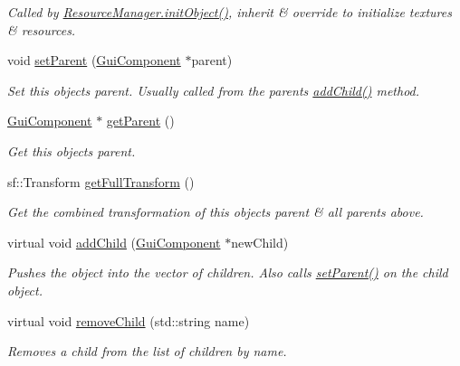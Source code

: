 \begin{DoxyCompactItemize}
\begin{DoxyCompactList}\small\item\em Called by \mbox{\hyperlink{class_resource_manager_ad543c034d0cef8fd2f3e8f32b49ebb3f}{Resource\+Manager.\+init\+Object()}}, inherit \& override to initialize textures \& resources. \end{DoxyCompactList}\item 
void \mbox{\hyperlink{class_gui_component_a526481fb2424c1ea771e78be27a091f9}{set\+Parent}} (\mbox{\hyperlink{class_gui_component}{Gui\+Component}} $\ast$parent)
\begin{DoxyCompactList}\small\item\em Set this object\textquotesingle{}s parent. Usually called from the parent\textquotesingle{}s \mbox{\hyperlink{class_gui_component_a5bccaccef3d0eab8af3be84cab1300de}{add\+Child()}} method. \end{DoxyCompactList}\item 
\mbox{\hyperlink{class_gui_component}{Gui\+Component}} $\ast$ \mbox{\hyperlink{class_gui_component_aba1969f731ef56396a1e69e50ff1f8fb}{get\+Parent}} ()
\begin{DoxyCompactList}\small\item\em Get this object\textquotesingle{}s parent. \end{DoxyCompactList}\item 
sf\+::\+Transform \mbox{\hyperlink{class_gui_component_a9402e70432502a9b8187365a95839a05}{get\+Full\+Transform}} ()
\begin{DoxyCompactList}\small\item\em Get the combined transformation of this object\textquotesingle{}s parent \& all parents above. \end{DoxyCompactList}\item 
virtual void \mbox{\hyperlink{class_gui_component_a5bccaccef3d0eab8af3be84cab1300de}{add\+Child}} (\mbox{\hyperlink{class_gui_component}{Gui\+Component}} $\ast$new\+Child)
\begin{DoxyCompactList}\small\item\em Pushes the object into the vector of children. Also calls \mbox{\hyperlink{class_gui_component_a526481fb2424c1ea771e78be27a091f9}{set\+Parent()}} on the child object. \end{DoxyCompactList}\item 
virtual void \mbox{\hyperlink{class_gui_component_ac979fb459db6feda90bc7c11a6a60623}{remove\+Child}} (std\+::string name)
\begin{DoxyCompactList}\small\item\em Removes a child from the list of children by name. \end{DoxyCompactList}\item 

\end{DoxyCompactItemize}
